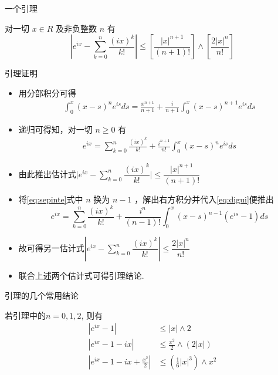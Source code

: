 \begin{frame}{一个引理}
	\begin{lem}\label{lem:eixtaylor}
		对一切 $x \in R$ 及非负整数 $n$ 有
		\[
		\left|e^{i x}-\sum_{k=0}^{n} \frac{(i x)^{k}}{k!}\right| \leq\left[\frac{|x|^{n+1}}{(n+1)!}\right] \wedge\left[\frac{2|x|^{n}}{n!}\right]
		\]
	\end{lem}

\end{frame}
\begin{frame}{引理证明}
\begin{itemize}
	\item 用分部积分可得
	\begin{align}\label{eq:sepinte}
		\int_{0}^{x}(x-s)^{n} e^{i s} d s=\frac{x^{n+1}}{n+1}+\frac{i}{n+1} \int_{0}^{x}(x-s)^{n+1} e^{i s} d s
	\end{align}

	\item 递归可得知，对一切 $n \geq 0$ 有
	\begin{align}\label{eq:digui}
		e^{i x}=\sum_{k=0}^{n} \frac{(i x)^{k}}{k!}+\frac{i^{n+1}}{n!} \int_{0}^{x}(x-s)^{n} e^{i s} d s
	\end{align}

	\item
	由此推出估计式$
	\big|e^{i x}-\sum_{k=0}^{n} \dfrac{(i x)^{k}}{k!}\big| \leq \dfrac{|x|^{n+1}}{(n+1)!}$
	\item 将\eqref{eq:sepinte}式中 $n$ 换为 $n-1$ ，解出右方积分并代入\eqref{eq:digui}便推出
	\[
	e^{i x}=\sum_{k=0}^{n} \frac{(i x)^{k}}{k!}+\frac{i^{n}}{(n-1)!} \int_{0}^{x}(x-s)^{n-1}\left(e^{i s}-1\right) d s
	\]
\item 故可得另一估计式$
	\left|e^{i x}-\sum_{k=0}^{n} \dfrac{(i x)^{k}}{k!}\right| \leq \dfrac{2|x|^{n}}{n!}$
\item 联合上述两个估计式可得引理结论.%


\end{itemize}

\end{frame}
\begin{frame}{引理的几个常用结论}
\begin{rmk} 若引理中的$n=0,1,2$, 则有%
	\begin{align*}
		\left|e^{i x}-1\right| & \leq|x| \wedge 2 \\
		\left|e^{i x}-1-i x\right| & \leq \frac{x^{2}}{2} \wedge(2|x|) \\
		\left|e^{i x}-1-i x+\frac{x^{2}}{2}\right| & \leq\left(\frac{1}{6}|x|^{3}\right) \wedge x^{2}
	\end{align*}
\end{rmk}

\end{frame}

